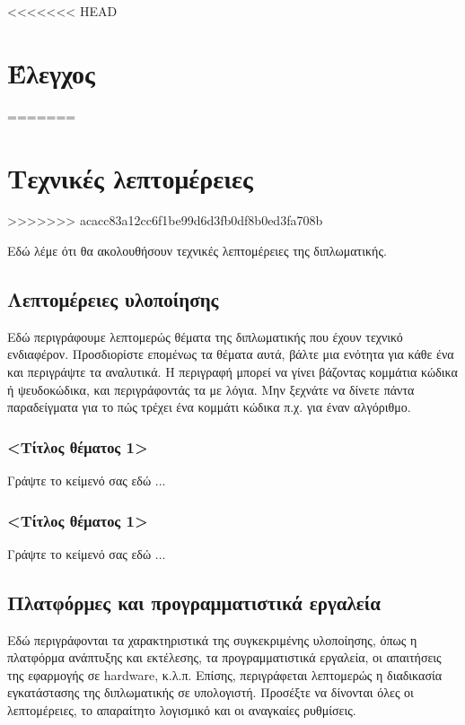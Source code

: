 <<<<<<< HEAD
\chapter{Έλεγχος}
\label{chap6}
=======
\chapter{Τεχνικές λεπτομέρειες}
\label{chap7}
>>>>>>> acacc83a12cc6f1be99d6d3fb0df8b0ed3fa708b

Εδώ λέμε ότι θα ακολουθήσουν τεχνικές λεπτομέρειες της διπλωματικής.

\section{Λεπτομέρειες υλοποίησης}

Εδώ περιγράφουμε λεπτομερώς θέματα της διπλωματικής που έχουν τεχνικό ενδιαφέρον. Προσδιορίστε επομένως τα θέματα αυτά, βάλτε μια ενότητα για κάθε ένα και περιγράψτε τα αναλυτικά. Η περιγραφή μπορεί να γίνει βάζοντας κομμάτια κώδικα ή ψευδοκώδικα, και περιγράφοντάς τα με λόγια. Μην ξεχνάτε να δίνετε πάντα παραδείγματα για το πώς τρέχει ένα κομμάτι κώδικα π.χ. για έναν αλγόριθμο.

\subsection{<Τίτλος θέματος 1>}
Γράψτε το κείμενό σας εδώ ...

\subsection{<Τίτλος θέματος 1>}
Γράψτε το κείμενό σας εδώ ...

\section{Πλατφόρμες και προγραμματιστικά εργαλεία}

Εδώ περιγράφονται τα χαρακτηριστικά της συγκεκριμένης υλοποίησης, όπως η πλατφόρμα ανάπτυξης και εκτέλεσης, τα προγραμματιστικά εργαλεία, οι απαιτήσεις της εφαρμογής σε hardware, κ.λ.π. Επίσης, περιγράφεται λεπτομερώς η διαδικασία εγκατάστασης της διπλωματικής σε υπολογιστή. Προσέξτε να δίνονται όλες οι λεπτομέρειες, το απαραίτητο λογισμικό και οι αναγκαίες ρυθμίσεις.
